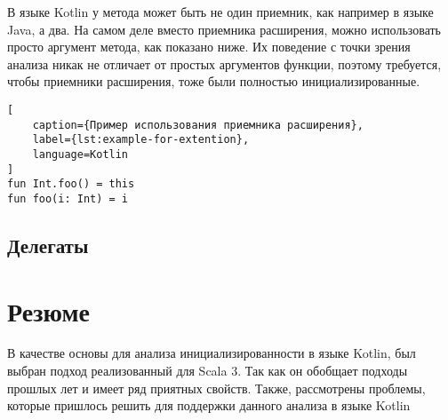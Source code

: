 В языке Kotlin у метода может быть не один приемник, как например в языке Java, а два.
На самом деле вместо приемника расширения, можно использовать просто аргумент метода, как показано ниже.
Их поведение с точки зрения анализа никак не отличает от простых аргументов функции, поэтому требуется,
чтобы приемники расширения, тоже были полностью инициализированные.
\begin{lstlisting}[
    caption={Пример использования приемника расширения},
    label={lst:example-for-extention},
    language=Kotlin
]
fun Int.foo() = this
fun foo(i: Int) = i
\end{lstlisting}

\subsection{Делегаты}\label{subsec:делегаты-}


\section{Резюме}\label{sec:резюме-}

В качестве основы для анализа инициализированности в языке Kotlin, был выбран подход реализованный для Scala 3.
Так как он обобщает подходы прошлых лет и имеет ряд приятных свойств.
Также, рассмотрены проблемы, которые пришлось решить для поддержки данного анализа в языке Kotlin